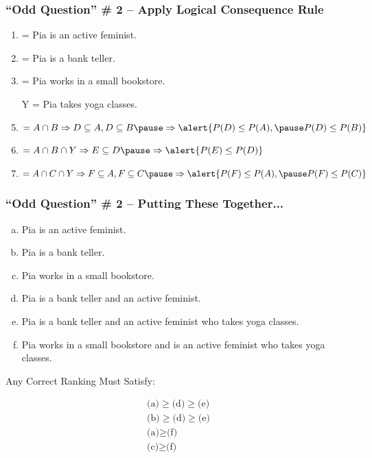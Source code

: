 \documentclass[handout]{beamer}
\begin{document}
\begin{frame}
\frametitle{``Odd Question'' \# 2 -- Apply Logical Consequence Rule}
		\begin{enumerate}[A]
			\item = Pia is an active feminist.
			\item = Pia is a bank teller.
			\item = Pia works in a small bookstore.
			\item[Y] = Pia takes yoga classes.\vspace{2em}
			\item $=A\cap B  \Rightarrow D\subseteq A, D\subseteq B \pause \Rightarrow \alert{P(D) \leq P(A), \pause P(D) \leq P(B)}$\pause
			\item $=A\cap B \cap Y\Rightarrow E\subseteq D \pause \Rightarrow \alert{P(E) \leq P(D)}$\pause
			\item $=A\cap C \cap Y \Rightarrow F \subseteq A, F \subseteq C \pause \Rightarrow \alert{P(F) \leq P(A), \pause P(F) \leq P(C)}$
		\end{enumerate}
\end{frame}
\begin{frame}
\frametitle{``Odd Question'' \# 2 -- Putting These Together...}
 \footnotesize
		\begin{enumerate}[(a)]
			\item Pia is an active feminist.
			\item Pia is a bank teller.
			\item Pia works in a small bookstore.
			\item Pia is a bank teller and an active feminist.
			\item Pia is a bank teller and an active feminist who takes yoga classes.
			\item Pia works in a small bookstore and is an active feminist who takes yoga classes.
		\end{enumerate}
\begin{alertblock}{Any Correct Ranking Must Satisfy:}\end{alertblock}
\begin{eqnarray*}
\mbox{(a)}\geq \mbox{(d)}\geq \mbox{(e)}\\
\mbox{(b)}\geq \mbox{(d)}\geq \mbox{(e)}\\
\mbox{(a)}\geq \mbox{(f)}\\
\mbox{(c)}\geq \mbox{(f)}
\end{eqnarray*}
\end{frame}
\end{document}

